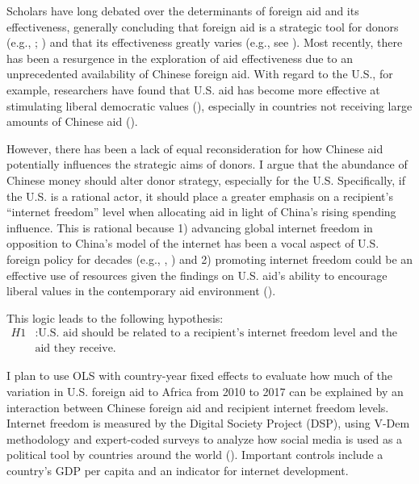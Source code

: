 Scholars have long debated over the determinants of foreign aid and its effectiveness, generally concluding that foreign aid is a strategic tool for donors (e.g., \cite{alesina2000}; \cite{hoeffler2011}) and that its effectiveness greatly varies (e.g., see \cite{christensen2011}). Most recently, there has been a resurgence in the exploration of aid effectiveness due to an unprecedented availability of Chinese foreign aid. With regard to the U.S., for example, researchers have found that U.S. aid has become more effective at stimulating liberal democratic values (\cite{blair2022}), especially in countries not receiving large amounts of Chinese aid (\cite{dreher2021}).

However, there has been a lack of equal reconsideration for how Chinese aid potentially influences the strategic aims of donors. I argue that the abundance of Chinese money should alter donor strategy, especially for the U.S. Specifically, if the U.S. is a rational actor, it should place a greater emphasis on a recipient's ``internet freedom'' level when allocating aid in light of China's rising spending influence. This is rational because 1) advancing global internet freedom in opposition to China's model of the internet has been a vocal aspect of U.S. foreign policy for decades (e.g., \cite{government2010}, \cite{government2022b}) and 2) promoting internet freedom could be an effective use of resources given the findings on U.S. aid's ability to encourage liberal values in the contemporary aid environment (\cite{blair2022}).

This logic leads to the following hypothesis:
\begin{align*}
    H1 &:\text{U.S. aid should be related to a recipient's internet freedom level and the amount of Chinese}\\
    &\text{aid they receive.}
\end{align*}

I plan to use OLS with country-year fixed effects to evaluate how much of the variation in U.S. foreign aid to Africa from 2010 to 2017 can be explained by an interaction between Chinese foreign aid and recipient internet freedom levels. Internet freedom is measured by the Digital Society Project (DSP), using V-Dem methodology and expert-coded surveys to analyze how social media is used as a political tool by countries around the world (\cite{mechkova2022}). Important controls include a country's GDP per capita and an indicator for internet development.